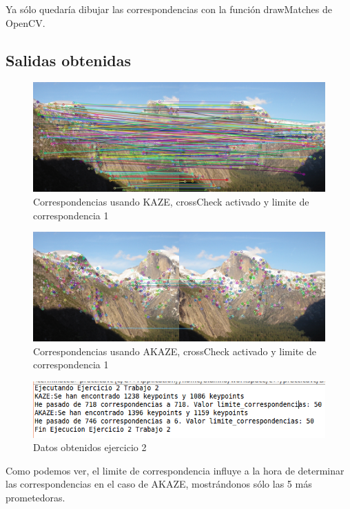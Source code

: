 Ya sólo quedaría dibujar las correspondencias con la función drawMatches de OpenCV.

\subsection{Salidas obtenidas}

\begin{figure}[H]
\centering
\includegraphics[width=1\linewidth]{ej2_kaze}
\caption{Correspondencias usando KAZE, crossCheck activado y limite de correspondencia 1}
\label{fig:ej2kaze}
\end{figure}

\begin{figure}[H]
	\centering
	\includegraphics[width=1\linewidth]{ej2_akaze}
	\caption{Correspondencias usando AKAZE, crossCheck activado y limite de correspondencia 1}
	\label{fig:ej2akaze}
\end{figure}

\begin{figure}[H]
\centering
\includegraphics[width=0.7\linewidth]{salidaTextoEj2}
\caption{Datos obtenidos ejercicio 2}
\label{fig:salidatextoej2}
\end{figure}


Como podemos ver, el limite de correspondencia influye a la hora de determinar las correspondencias en el caso de AKAZE, mostrándonos sólo las 5 más prometedoras.

